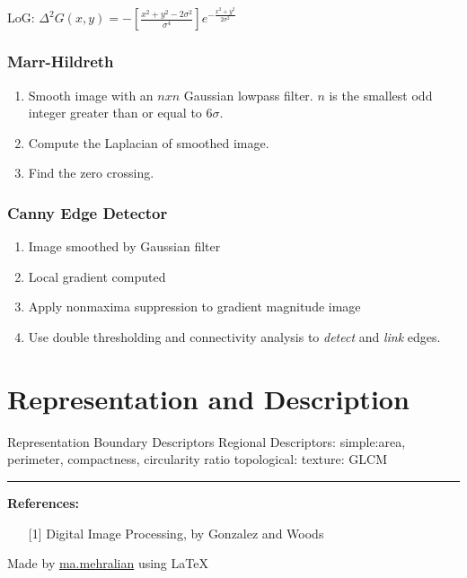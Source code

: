 \documentclass{../cheat}
\begin{document}
\begin{multicols}{3}
	LoG: $\Delta^2 G(x,y) = - \left[ \frac{x^2 + y^2 - 2\sigma^2}{\sigma^4 } \right]
	e ^{-\frac{x^2 + y^2}{2 \sigma^2 }}$

	\subsubsection*{Marr-Hildreth}
	\begin{enumerate}
		\item Smooth image with an $nxn$ Gaussian lowpass filter. {\tiny $n$ is the smallest odd integer greater than or equal to $6\sigma$}.
		\item Compute the Laplacian of smoothed image.
		\item Find the zero crossing.
	\end{enumerate}
		
	\subsubsection*{Canny Edge Detector}
	\begin{enumerate}
		\item Image smoothed by Gaussian filter
		\item Local gradient computed
		\item Apply nonmaxima suppression to gradient magnitude image
		\item Use double thresholding and connectivity analysis to \textit{detect} and \textit{link} edges.
	\end{enumerate}
	
	\section{Representation and Description}
	
	Representation
	Boundary Descriptors
	Regional Descriptors: 
	 simple:area, perimeter, compactness, circularity ratio
	 topological: 
	 texture: GLCM
	
\vspace{5mm}
\rule{0.3\linewidth}{0.25pt}
\scriptsize

\textbf{References:}
\begin{itemize}[leftmargin=2em]
	\item [{[1]}] Digital Image Processing, by Gonzalez and Woods
\end{itemize}
Made by \href{http://webpages.iust.ac.ir/mehralian/}{ma.mehralian} using \LaTeX
\end{multicols}
\end{document}
